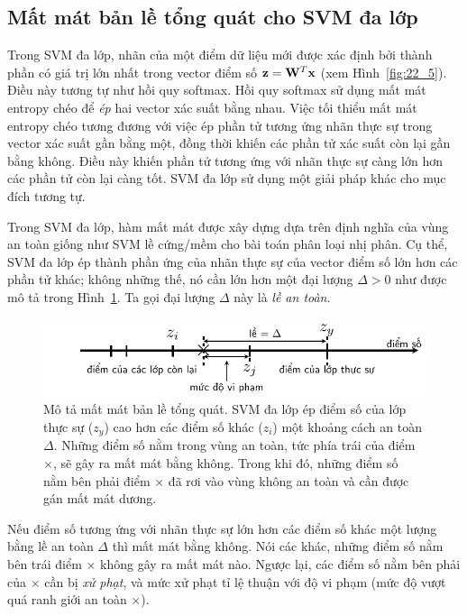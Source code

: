 \subsection{Mất mát bản lề tổng quát cho SVM đa lớp}
Trong SVM đa lớp, nhãn của một điểm dữ liệu mới được xác định bởi thành phần có
giá trị lớn nhất trong vector điểm số $\mathbf{z} = \mathbf{W}^T\mathbf{x}$ (xem
Hình~\ref{fig:22_5}). Điều này tương tự như hồi quy softmax. Hồi quy softmax sử
dụng mất mát entropy chéo để \textit{ép} hai vector xác suất bằng nhau. Việc tối
thiểu mất mát entropy chéo tương đương với việc ép phần tử tương ứng {nhãn}
thực sự trong vector xác suất gần bằng một, đồng thời khiến các phần tử xác suất
còn lại gần bằng không. Điều này khiến  phần tử tương ứng với nhãn thực sự càng
lớn hơn các phần tử còn lại càng tốt. SVM đa lớp sử dụng một giải pháp khác cho
{mục đích tương tự}.

Trong SVM đa lớp, hàm mất mát được xây dựng dựa trên định nghĩa của vùng an toàn
giống như SVM lề cứng/mềm cho bài toán phân loại nhị phân. Cụ thể, SVM đa lớp ép
thành phần ứng của nhãn thực sự của vector điểm số lớn hơn các phần tử khác;
không những thế, nó cần lớn hơn một đại lượng $\Delta > 0$ như được mô tả trong
Hình~\ref{fig:22_6}. Ta gọi đại lượng $\Delta$ này là \textit{lề an toàn}.

\begin{figure}[t]
\centering
\includegraphics[width
=.85\textwidth]{Chapters/09_SupportVectorMachines/22_multiclasssvm/latex/hinge2.pdf}
\caption[]{Mô tả mất mát bản lề tổng quát. SVM đa lớp ép điểm số của lớp thực sự ($z_y$) cao hơn các điểm số khác
($z_i$) một khoảng cách an toàn $\Delta$. Những điểm số nằm trong vùng an toàn, tức phía trái của điểm $\times$, sẽ gây ra mất mát bằng không. Trong khi đó, những điểm số nằm bên phải điểm $\times$ đã rơi vào vùng không an toàn và cần được gán mất mát dương.}
\label{fig:22_6}
\end{figure}

Nếu điểm số tương ứng với nhãn thực sự lớn hơn các điểm số khác một lượng bằng
lề an toàn $\Delta$ thì mất mát bằng không. Nói các khác, những điểm số nằm bên
trái điểm $\times$ không gây ra mất mát nào. Ngược lại, các điểm số nằm bên phải
của $\times$ cần bị \textit{xử phạt}, và mức xử phạt tỉ lệ thuận với độ vi
phạm (mức độ vượt quá ranh giới an toàn $\times$).


